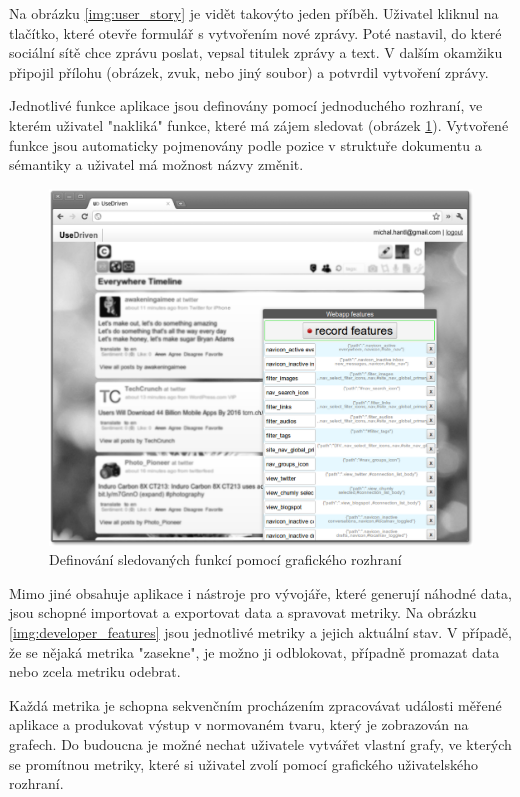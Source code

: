 \documentclass[bc,male,java,dept456]{diploma}						%
\begin{document}
Na obrázku \ref{img:user_story} je vidět takovýto jeden příběh. Uživatel kliknul na tlačítko, které otevře formulář s vytvořením nové zprávy. Poté nastavil, do které sociální sítě chce zprávu poslat, vepsal titulek zprávy a text. V dalším okamžiku připojil přílohu (obrázek, zvuk, nebo jiný soubor) a potvrdil vytvoření zprávy.

Jednotlivé funkce aplikace jsou definovány pomocí jednoduchého rozhraní, ve kterém uživatel "nakliká" funkce, které má zájem sledovat (obrázek \ref{img:define_features}). Vytvořené funkce jsou automaticky pojmenovány podle pozice v struktuře dokumentu a sémantiky a uživatel má možnost názvy změnit.

\begin{figure}[h]
	\centering
	\includegraphics[width=14cm]{img/ud_chumly_define_features_blurry_bw.pdf}
	\caption{Definování sledovaných funkcí pomocí grafického rozhraní}
	\label{img:define_features}
\end{figure}

Mimo jiné obsahuje aplikace i nástroje pro vývojáře, které generují náhodné data, jsou schopné importovat a exportovat data a spravovat metriky. Na obrázku \ref{img:developer_features} jsou jednotlivé metriky a jejich aktuální stav. V případě, že se nějaká metrika "zasekne", je možno ji odblokovat, případně promazat data nebo zcela metriku odebrat.

Každá metrika je schopna sekvenčním procházením zpracovávat události měřené aplikace a produkovat výstup v normovaném tvaru, který je zobrazován na grafech. Do budoucna je možné nechat uživatele vytvářet vlastní grafy, ve kterých se promítnou metriky, které si uživatel zvolí pomocí grafického uživatelského rozhraní.
\end{document}
